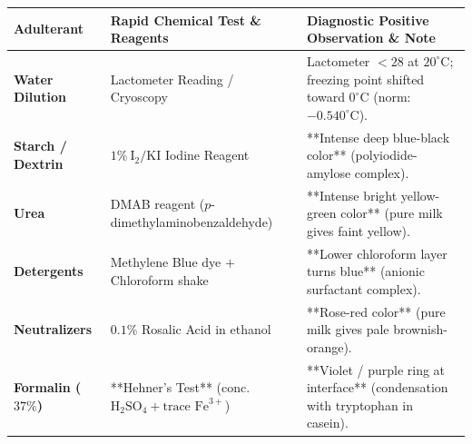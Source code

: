 \documentclass[10pt,a4paper,oneside]{article}
\begin{document}
\begin{center}
\small
\begin{tabular}{@{}p{3.0cm} p{5.5cm} p{8.5cm}@{}}
\toprule
\textbf{Adulterant} & \textbf{Rapid Chemical Test \& Reagents} & \textbf{Diagnostic Positive Observation \& Note} \tabularnewline
\midrule
\textbf{Water Dilution} & Lactometer Reading / Cryoscopy & Lactometer $<28$ at $20^\circ\text{C}$; freezing point shifted toward $0^\circ\text{C}$ (norm: $-0.540^\circ\text{C}$). \tabularnewline
\textbf{Starch / Dextrin} & $1\%\ \mathrm{I_2 / KI}$ Iodine Reagent & **Intense deep blue-black color** (polyiodide-amylose complex). \tabularnewline
\textbf{Urea} & DMAB reagent ($p$-dimethylaminobenzaldehyde) & **Intense bright yellow-green color** (pure milk gives faint yellow). \tabularnewline
\textbf{Detergents} & Methylene Blue dye $+$ Chloroform shake & **Lower chloroform layer turns blue** (anionic surfactant complex). \tabularnewline
\textbf{Neutralizers} & $0.1\%$ Rosalic Acid in ethanol & **Rose-red color** (pure milk gives pale brownish-orange). \tabularnewline
\textbf{Formalin ($37\%$)} & **Hehner's Test** (conc. $\mathrm{H_2SO_4} + \text{trace }\mathrm{Fe}^{3+}$) & **Violet / purple ring at interface** (condensation with tryptophan in casein). \tabularnewline
\bottomrule
\end{tabular}
\end{center}

\vspace{0.1cm}
\end{document}
